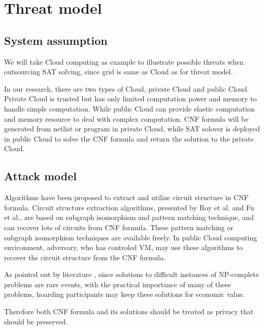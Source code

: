 \documentclass[conference,compsocconf]{IEEEtran}
\begin{document}
\section{Threat model}
\subsection{System assumption}
We will take Cloud computing as example to illustrate possible threats when outsourcing SAT solving,
since grid is same as Cloud as for threat model.

In our research, there are two types of Cloud, private Cloud and public Cloud.
Private Cloud is trusted but has only limited computation power and memory to handle simple computation.
While public Cloud can provide elastic computation and memory resource to deal with complex computation.
CNF formula will be generated from netlist or program in private Cloud,
while SAT solover is deployed in public Cloud to solve the CNF formula and return the solution to the private Cloud.
\subsection{Attack model}

Algorithms \cite{csLiequivalency,csOstrowski,csRoy,csFu}
have been proposed to extract and utilize circuit structure in CNF formula.
Circuit structure extraction algorithms,
presented by Roy et al. \cite{csRoy} and Fu et al.\cite{csFu},
are based on subgraph isomorphism and pattern matching technique,
and can recover lots of circuits from CNF formula.
These pattern matching or subgraph isomorphism techniques are available freely.
In public Cloud computing environment, adversary, who has controled VM\cite{InformationLeakageofCloud,AMI},
may use these algorithms to recover the circuit structure from the CNF formula.

As pointed out by literature \cite{HV-grid}, since solutions to difficult instances of NP-complete problems are rare events,
with the practical importance of many of these problems, hoarding participants may keep these solutions for economic value.

Therefore both CNF formula and its solutions should  be treated as privacy that should be preserved.
\end{document}
